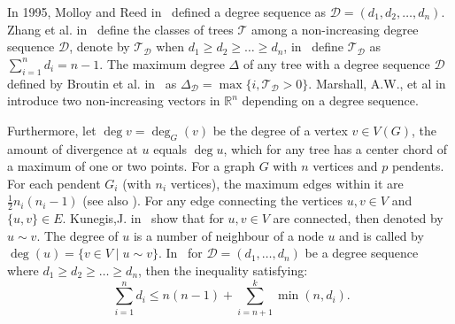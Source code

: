 \documentclass[12pt]{amsart}
\begin{document}
In 1995, Molloy and Reed in~\cite{Molloy} defined a degree sequence as $\mathscr{D}=(d_1,d_2,\dots,d_n)$. Zhang et al. in~\cite{Zhang} define the classes of trees $\mathcal{T}$ among a non-increasing degree sequence $\mathscr{D}$, denote by $\mathcal{T}_{\mathscr{D}}$ when $d_1\geqslant d_2\geqslant\dots \geqslant d_n$, in~\cite{Blanc} define $\mathcal{T}_{\mathscr{D}}$ as $\sum_{i=1}^{n}d_i=n-1$. The maximum degree $\Delta$ of any tree with a degree sequence $\mathscr{D}$ defined by Broutin et al. in~\cite{Broutin} as $\Delta_{\mathscr{D}}=\max \{i, \mathcal{T}_{\mathscr{D}}>0\}$. Marshall, A.W., et al in~\cite{Marshall79Olkin} introduce two non-increasing vectors in $\mathbb{R}^n$ depending on a degree sequence.\par 
Furthermore, let $\deg v=\deg_G(v)$ be the degree of a vertex $v\in V(G)$, the amount of divergence at $u$ equals $\deg u$, which for any tree has a center chord of a maximum of one or two points. For a graph $G$ with $n$ vertices and $p$ pendents. For each pendent $G_i$ (with $n_i$ vertices), the maximum edges within it are $\frac{1}{2}n_i(n_i - 1)$ (see also \cite{Harary}). For any edge connecting the vertices $u, v \in V$  and  $\{u,v\} \in E$.  Kunegis,J. in~\cite{KunegisJ} show that for $u,v \in V$ are connected, then denoted by $u \sim v$. The degree of $u$ is a number of neighbour of a node $u$ and is called by $\deg (u)=\{v \in V \mid u \sim v\}$. In~\cite{Gallaipp,Brandt}
for $\mathscr{D}=(d_1,\dots,d_n)$ be a degree sequence  where $d_1\geqslant d_2\geqslant \dots \geqslant d_n$, then the inequality satisfying: 
\begin{equation}~\label{eq1}
    \sum_{i=1}^{n}d_i\leq n(n-1)+\sum_{i=n+1}^{k} \min(n,d_i).
\end{equation}
\end{document}
